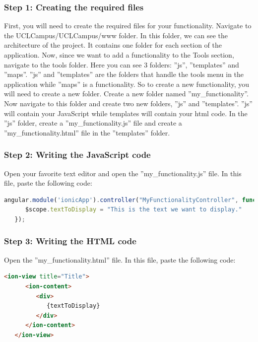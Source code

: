 \documentclass{eplmastersthesis}
\begin{document}
\subsubsection{Step 1: Creating the required files}
First, you will need to create the required files for your functionality. Navigate to the UCLCampus/UCLCampus/www folder. In this folder, we can see the architecture of the project. It contains one folder for each section of the application. Now, since we want to add a functionality to the Tools section, navigate to the tools folder. Here you can see 3 folders: ''js'', ''templates'' and ''maps''. ''js'' and ''templates'' are the folders that handle the tools menu in the application while ''maps'' is a functionality. So to create a new functionality, you will need to create a new folder.
Create a new folder named ''my\_functionality''. Now navigate to this folder and create two new folders, ''js'' and ''templates''. ''js'' will contain your JavaScript while templates will contain your html code. In the ''js'' folder, create a ''my\_functionality.js'' file and create a ''my\_functionality.html'' file in the ''templates'' folder.
\subsubsection{Step 2: Writing the JavaScript code}
Open your favorite text editor and open the ''my\_functionality.js'' file. In this file, paste the following code:
\begin{lstlisting}[language=JavaScript]
   angular.module('ionicApp').controller("MyFunctionalityController", function($scope) {
      $scope.textToDisplay = "This is the text we want to display."
   });
\end{lstlisting} 
\subsubsection{Step 3: Writing the HTML code}
Open the ''my\_functionality.html'' file.   In this file, paste the following code:
\begin{lstlisting}[language=HTML]
   <ion-view title="Title">
      <ion-content>
         <div>
            {textToDisplay}
         </div>
      </ion-content>
   </ion-view>	
\end{lstlisting} 
\end{document}

